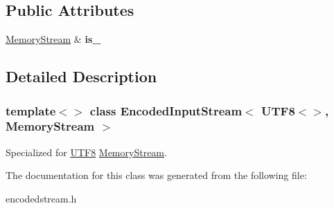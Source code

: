 \subsection*{Public Attributes}
\begin{DoxyCompactItemize}
\item 
\mbox{\label{a02128_ad5e48564bbd14297a4cc445af3a4aa83}} 
\hyperlink{a02296}{Memory\+Stream} \& {\bfseries is\+\_\+}
\end{DoxyCompactItemize}


\subsection{Detailed Description}
\subsubsection*{template$<$$>$\newline
class Encoded\+Input\+Stream$<$ U\+T\+F8$<$$>$, Memory\+Stream $>$}

Specialized for \hyperlink{a02144}{U\+T\+F8} \hyperlink{a02296}{Memory\+Stream}. 

The documentation for this class was generated from the following file\+:\begin{DoxyCompactItemize}
\item 
encodedstream.\+h\end{DoxyCompactItemize}
